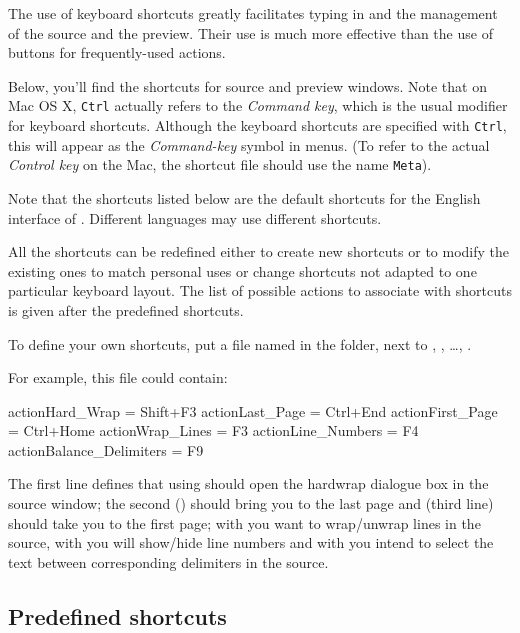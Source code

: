 The use of keyboard shortcuts greatly facilitates typing in and the management of the source and the preview. Their use is much more effective than the use of buttons for frequently-used actions.

Below, you'll find the shortcuts for source and preview windows. Note that on Mac OS X, \verb|Ctrl| actually refers to the \emph{Command key}, which is the usual modifier for keyboard shortcuts. Although the keyboard shortcuts are specified with \verb|Ctrl|, this will appear as the \emph{Command-key} symbol in menus. (To refer to the actual \emph{Control key} on the Mac, the shortcut file should use the name \verb|Meta|).

Note that the shortcuts listed below are the default shortcuts for the English interface of {\Tw}. Different languages may use different shortcuts.

All the shortcuts can be redefined either to create new shortcuts or to modify the existing ones to match personal uses or change shortcuts not adapted to one particular keyboard layout. The list of possible actions to associate with shortcuts is given after the predefined shortcuts.

To define your own shortcuts, put a file named  in the  folder, next to , , \dots, .

For example, this  file could contain:
\begin{verbExample}
actionHard_Wrap = Shift+F3
actionLast_Page = Ctrl+End
actionFirst_Page = Ctrl+Home
actionWrap_Lines = F3
actionLine_Numbers = F4
actionBalance_Delimiters = F9
\end{verbExample}

The first line defines that using  should open the hardwrap dialogue box in the source window; the second () should bring you to the last page and  (third line) should take you to the first page; with  you want to wrap/unwrap lines in the source, with  you will show/hide line numbers and with  you intend to select the text between corresponding delimiters in the source.

\subsection{Predefined shortcuts}


